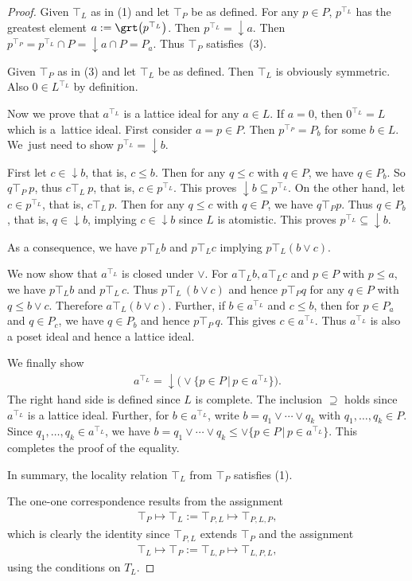 \documentclass[pdftex]{sigma}
\numberwithin{equation}{section}
\begin{document}
\begin{proof}
Given $\top_L$ as in (1) and let $\top_P$ be as defined. For any $p\in P$, $p^{\top_L}$ has the greatest element $a:=\grt \big(p^{\top_L}\big)$. Then $p^{\top_L}=\downarrow a$. Then $p^{\top_P}=p^{\top_L}\cap P= \downarrow a \cap P=P_a$. Thus $\top_P$ satisfies~(3).

Given $\top_P$ as in (3) and let $\top_L$ be as defined. Then $\top_L$ is obviously symmetric. Also $0\in L^{\top_L}$ by definition.

Now we prove that $a^{\top _L}$ is a lattice ideal for any $a\in L$. If $a=0$, then $0^{\top _L}=L$ which is a~lattice ideal. First consider $a=p\in P$. Then $p^{\top _P}=P_b$ for some $b\in L$. We~just need to show $p^{\top_L}=\downarrow b$.
	
First let $c\in \downarrow b$, that is, $c\le b$. Then for any $q\le c$ with $q\in P$, we have $q\in P_b$. So $q\top _P \ p$, thus $c\top _L \ p$, that is, $c\in p^{\top_L}$. This proves $\downarrow b \subseteq p^{\top_L}$.
On the other hand, let $c\in p^{\top_L}$, that is, $c\top_L\, p$. Then for any $q\leq c$ with $q\in P$, we have $q\top_P p$. Thus $q\in P_b$, that is, $q\in \downarrow b$, implying $c\in \downarrow b$ since $L$ is atomistic. This proves $p^{\top_L}\subseteq \downarrow b$.

As a consequence, we have $p\top_L b$ and $p\top_L c$ implying $p\top_L(b\vee c)$.

We now show that $a^{\top_L}$ is closed under $\vee$. For $a\top_L b, a\top_L c$ and $p\in P$ with $p\leq a$, we have $p\top_L b$ and $p\top_L\, c$. Thus $p\top_L\, (b\vee c)$ and hence $p\top_P q$ for any $q\in P$ with $q\leq b\vee c$. Therefore $a \top_L (b\vee c)$. Further, if $b\in a^{\top_L}$ and $c\leq b$, then for $p\in P_a$ and $q\in P_c$, we have $q\in P_b$ and hence $p\top_P\, q$. This gives $c\in a^{\top_L}$. Thus $a^{\top_L}$ is also a poset ideal and hence a lattice ideal.

We finally show
\begin{gather*}
a^{\top_L} = \downarrow \big(\vee\big\{p\in P\,|\, p\in a^{\top_L}\big\}\big).
\end{gather*}
The right hand side is defined since $L$ is complete. The inclusion $\supseteq $ holds since $a^{\top _L}$ is a lattice ideal. Further, for $b\in a^{\top_L}$, write $b=q_1\vee \cdots \vee q_k$ with $q_1,\ldots,q_k\in P$. Since $q_1,\ldots, q_k\in a^{\top_L}$, we have $b=q_1\vee \cdots \vee q_k\leq \vee\big\{p\in P\,|\, p\in a^{\top_L}\big\}$. This completes the proof of the equality.

In summary, the locality relation $\top_L$ from $\top_P$ satisfies (1).

The one-one correspondence results from the assignment
\begin{gather*}\top_P\mapsto \top_L:=\top_{P,L}\mapsto \top_{P,L,P},
\end{gather*}
which is clearly the identity since $\top_{P,L}$ extends $\top_P$ and the assignment
\begin{gather*}
\top_L\mapsto \top_P:=\top_{L,P}\mapsto \top_{L,P,L},
\end{gather*}
 using the conditions on $T_L$.
\end{proof}
\end{document}
